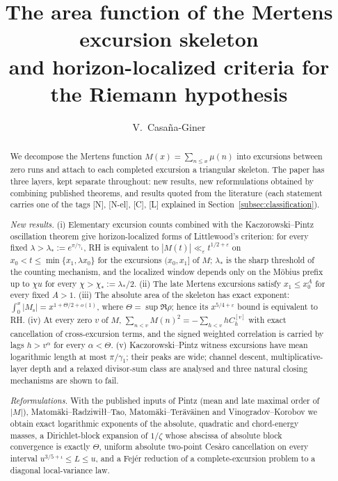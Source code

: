\documentclass[11pt]{amsart}
\title[The Mertens excursion skeleton]{The area function of the Mertens excursion skeleton\\
and horizon-localized criteria for the Riemann hypothesis}
\author{V.~Casa\~na-Giner}
\date{}
\numberwithin{equation}{section}
\theoremstyle{plain}
\theoremstyle{definition}
\theoremstyle{remark}
\newcommand{\Ms}{M_{\mathrm{s}}}
\newcommand{\eps}{\varepsilon}
\begin{document}
\begin{abstract}
We decompose the Mertens function $M(x)=\sum_{n\le x}\mu(n)$ into excursions
between zero runs and attach to each completed excursion a triangular
skeleton. The paper has three layers, kept separate throughout: new results,
new reformulations obtained by combining published theorems, and results
quoted from the literature (each statement carries one of the tags
\textup{[N]}, \textup{[N-el]}, \textup{[C]}, \textup{[L]} explained in
Section~\ref{subsec:classification}).

\emph{New results.} (i) Elementary excursion counts combined with the
Kaczorowski--Pintz oscillation theorem give horizon-localized forms of
Littlewood's criterion: for every fixed $\lambda>\lambda_*:=e^{\pi/\gamma_1}$,
RH is equivalent to $|M(t)|\ll_\eps t^{1/2+\eps}$ on
$x_0<t\le\min\{x_1,\lambda x_0\}$ for the excursions $(x_0,x_1]$ of $M$;
$\lambda_*$ is the sharp threshold of the counting mechanism, and the
localized window depends only on the Möbius prefix up to $\chi u$ for every
$\chi>\chi_*:=\lambda_*/2$. (ii) The late Mertens excursions satisfy
$x_1\le x_0^{A}$ for every fixed $A>1$. (iii) The absolute area of the
skeleton has exact exponent: $\int_0^x|\Ms|=x^{1+\Theta/2+o(1)}$, where
$\Theta=\sup\Re\rho$; hence its $x^{5/4+\eps}$ bound is equivalent to RH.
(iv) At every zero $v$ of $M$,
$\sum_{n<v}M(n)^2=-\sum_{h<v}hC_h^{[v]}$ with exact cancellation of
cross-excursion terms, and the signed weighted correlation is carried by lags
$h>v^{\alpha}$ for every $\alpha<\Theta$. (v) Kaczorowski--Pintz witness
excursions have mean logarithmic length at most $\pi/\gamma_1$; their peaks
are wide; channel descent, multiplicative-layer depth and a relaxed
divisor-sum class are analysed and three natural closing mechanisms are shown
to fail.

\emph{Reformulations.} With the published inputs of Pintz (mean and late
maximal order of $|M|$), Matomäki--Radziwiłł--Tao, Matomäki--Teräväinen and
Vinogradov--Korobov we obtain exact logarithmic exponents of the absolute,
quadratic and chord-energy masses, a Dirichlet-block expansion of $1/\zeta$
whose abscissa of absolute block convergence is exactly $\Theta$, uniform
absolute two-point Cesàro cancellation on every interval
$u^{3/5+\iota}\le L\le u$, and a Fejér reduction of a complete-excursion
problem to a diagonal local-variance law.
\end{abstract}

\maketitle
\end{document}
